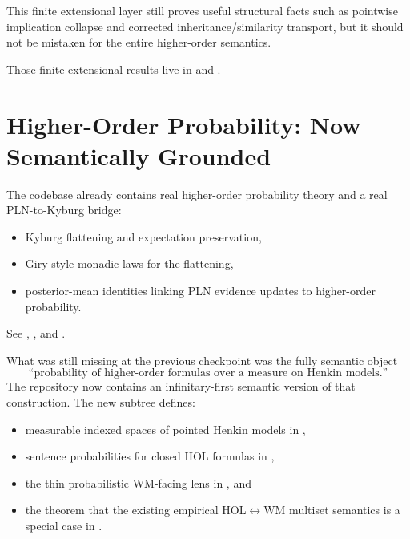 \documentclass[11pt,openany]{report}
\begin{document}
This finite extensional layer still proves useful structural facts such as
pointwise implication collapse and corrected inheritance/similarity transport,
but it should not be mistaken for the entire higher-order semantics.

Those finite extensional results live in
 and
.

\section{Higher-Order Probability: Now Semantically Grounded}

The codebase already contains real higher-order probability theory and a real
PLN-to-Kyburg bridge:
\begin{itemize}
\item Kyburg flattening and expectation preservation,
\item Giry-style monadic laws for the flattening,
\item posterior-mean identities linking PLN evidence updates to higher-order
  probability.
\end{itemize}

See
,
,
and .

What was still missing at the previous checkpoint was the fully semantic object
\[
  \text{``probability of higher-order formulas over a measure on Henkin models.''}
\]
The repository now contains an infinitary-first semantic version of that
construction.  The new subtree
 defines:
\begin{itemize}
\item measurable indexed spaces of pointed Henkin models in
  ,
\item sentence probabilities for closed HOL formulas in
  ,
\item the thin probabilistic WM-facing lens in
  , and
\item the theorem that the existing empirical HOL$\leftrightarrow$WM multiset
  semantics is a special case in
  .
\end{itemize}
\end{document}
